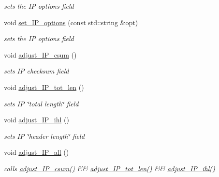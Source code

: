 \begin{CompactItemize}
\begin{CompactList}\small\item\em sets the IP options field \item\end{CompactList}\item 
void \hyperlink{classsocketpp_1_1IP__RawSocket_9d88ecec5e362b3cf3d3dbc51d5dd0cd}{set\_\-IP\_\-options} (const std::string \&opt)
\begin{CompactList}\small\item\em sets the IP options field \item\end{CompactList}\item 
void \hyperlink{classsocketpp_1_1IP__RawSocket_187bab79c6a8bae17b400a132063a9d1}{adjust\_\-IP\_\-csum} ()
\begin{CompactList}\small\item\em sets IP checksum field \item\end{CompactList}\item 
void \hyperlink{classsocketpp_1_1IP__RawSocket_32d2c08139fb43abb92679bdabecf778}{adjust\_\-IP\_\-tot\_\-len} ()
\begin{CompactList}\small\item\em sets IP \char`\"{}total length\char`\"{} field \item\end{CompactList}\item 
void \hyperlink{classsocketpp_1_1IP__RawSocket_d84d5e193a15baf421c64011a9c27359}{adjust\_\-IP\_\-ihl} ()
\begin{CompactList}\small\item\em sets IP \char`\"{}header length\char`\"{} field \item\end{CompactList}\item 
void \hyperlink{classsocketpp_1_1IP__RawSocket_45e60510233daaa2f279d3a4706fdce5}{adjust\_\-IP\_\-all} ()
\begin{CompactList}\small\item\em calls \hyperlink{classsocketpp_1_1IP__RawSocket_187bab79c6a8bae17b400a132063a9d1}{adjust\_\-IP\_\-csum()} \&\& \hyperlink{classsocketpp_1_1IP__RawSocket_32d2c08139fb43abb92679bdabecf778}{adjust\_\-IP\_\-tot\_\-len()} \&\& \hyperlink{classsocketpp_1_1IP__RawSocket_d84d5e193a15baf421c64011a9c27359}{adjust\_\-IP\_\-ihl()} \item\end{CompactList}\item 

\end{CompactItemize}
